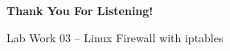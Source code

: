 \begin{frame}[plain]
  \centering
  \vfill
  {\fontsize{34}{40}\selectfont\bfseries Thank You For Listening!\par}
  \vspace{0.5cm}
  {\fontsize{18}{22}\selectfont Lab Work 03 -- Linux Firewall with iptables\par}
  \vfill
\end{frame}
